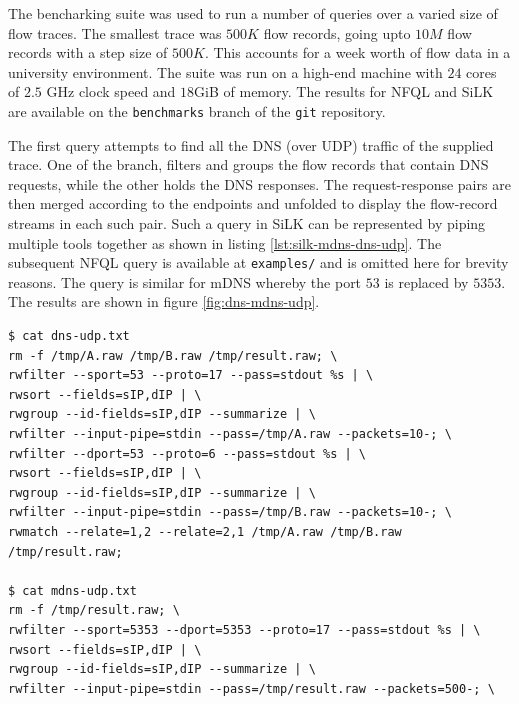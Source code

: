 The bencharking suite was used to run a number of queries over a varied size
of flow traces. The smallest trace was $500K$ flow records, going upto $10M$
flow records with a step size of $500K$. This accounts for a week worth of
flow data in a university environment. The suite was run on a high-end machine
with $24$ cores of $2.5$ GHz clock speed and $18$GiB of memory. The results
for NFQL and SiLK are available on the \texttt{benchmarks} branch of the
\texttt{git} repository.

The first query attempts to find all the DNS (over UDP) traffic of the
supplied trace. One of the branch, filters and groups the flow records that
contain DNS requests, while the other holds the DNS responses. The
request-response pairs are then merged according to the endpoints and unfolded
to  display the flow-record
streams in each such pair. Such a query in SiLK can be represented by piping
multiple tools together as shown in listing \ref{lst:silk-mdns-dns-udp}. The
subsequent NFQL query is available at \texttt{examples/} and is omitted here
for brevity reasons. The query is similar for mDNS whereby the port $53$ is
replaced by $5353$. The results are shown in figure \ref{fig:dns-mdns-udp}.

\begin{lstlisting}
$ cat dns-udp.txt 
rm -f /tmp/A.raw /tmp/B.raw /tmp/result.raw; \
rwfilter --sport=53 --proto=17 --pass=stdout %s | \
rwsort --fields=sIP,dIP | \
rwgroup --id-fields=sIP,dIP --summarize | \
rwfilter --input-pipe=stdin --pass=/tmp/A.raw --packets=10-; \
rwfilter --dport=53 --proto=6 --pass=stdout %s | \
rwsort --fields=sIP,dIP | \
rwgroup --id-fields=sIP,dIP --summarize | \
rwfilter --input-pipe=stdin --pass=/tmp/B.raw --packets=10-; \
rwmatch --relate=1,2 --relate=2,1 /tmp/A.raw /tmp/B.raw /tmp/result.raw;

$ cat mdns-udp.txt
rm -f /tmp/result.raw; \
rwfilter --sport=5353 --dport=5353 --proto=17 --pass=stdout %s | \
rwsort --fields=sIP,dIP | \
rwgroup --id-fields=sIP,dIP --summarize | \
rwfilter --input-pipe=stdin --pass=/tmp/result.raw --packets=500-; \
\end{lstlisting}

